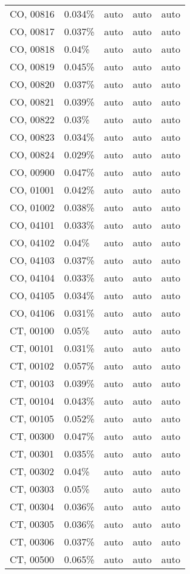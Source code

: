 \begin{longtable}[]{@{}lllll@{}}
CO, 00816 & 0.034\% & auto & auto & auto \\
CO, 00817 & 0.037\% & auto & auto & auto \\
CO, 00818 & 0.04\% & auto & auto & auto \\
CO, 00819 & 0.045\% & auto & auto & auto \\
CO, 00820 & 0.037\% & auto & auto & auto \\
CO, 00821 & 0.039\% & auto & auto & auto \\
CO, 00822 & 0.03\% & auto & auto & auto \\
CO, 00823 & 0.034\% & auto & auto & auto \\
CO, 00824 & 0.029\% & auto & auto & auto \\
CO, 00900 & 0.047\% & auto & auto & auto \\
CO, 01001 & 0.042\% & auto & auto & auto \\
CO, 01002 & 0.038\% & auto & auto & auto \\
CO, 04101 & 0.033\% & auto & auto & auto \\
CO, 04102 & 0.04\% & auto & auto & auto \\
CO, 04103 & 0.037\% & auto & auto & auto \\
CO, 04104 & 0.033\% & auto & auto & auto \\
CO, 04105 & 0.034\% & auto & auto & auto \\
CO, 04106 & 0.031\% & auto & auto & auto \\
CT, 00100 & 0.05\% & auto & auto & auto \\
CT, 00101 & 0.031\% & auto & auto & auto \\
CT, 00102 & 0.057\% & auto & auto & auto \\
CT, 00103 & 0.039\% & auto & auto & auto \\
CT, 00104 & 0.043\% & auto & auto & auto \\
CT, 00105 & 0.052\% & auto & auto & auto \\
CT, 00300 & 0.047\% & auto & auto & auto \\
CT, 00301 & 0.035\% & auto & auto & auto \\
CT, 00302 & 0.04\% & auto & auto & auto \\
CT, 00303 & 0.05\% & auto & auto & auto \\
CT, 00304 & 0.036\% & auto & auto & auto \\
CT, 00305 & 0.036\% & auto & auto & auto \\
CT, 00306 & 0.037\% & auto & auto & auto \\
CT, 00500 & 0.065\% & auto & auto & auto \\

\end{longtable}
